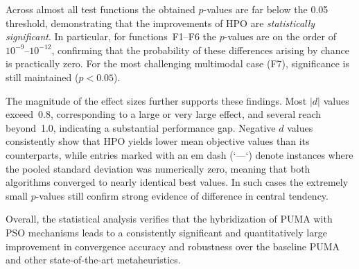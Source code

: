 \documentclass[a4paper,12pt]{article}
\begin{document}
Across almost all test functions the obtained $p$-values are far below the
0.05 threshold, demonstrating that the improvements of HPO are
\textit{statistically significant}.
In particular, for functions~F1–F6 the $p$-values are on the order of
$10^{-9}$–$10^{-12}$, confirming that the probability of these differences
arising by chance is practically zero.
For the most challenging multimodal case (F7), significance is still
maintained ($p<0.05$).

The magnitude of the effect sizes further supports these findings.
Most $|d|$ values exceed~0.8, corresponding to a large or very large effect,
and several reach beyond~1.0, indicating a substantial performance gap.
Negative $d$ values consistently show that HPO yields lower mean objective
values than its counterparts, while entries marked with an em dash
(`---`) denote instances where the pooled standard deviation was numerically
zero, meaning that both algorithms converged to nearly identical best values.
In such cases the extremely small $p$-values still confirm strong evidence
of difference in central tendency.

Overall, the statistical analysis verifies that the hybridization of
PUMA with PSO mechanisms leads to a consistently significant and
quantitatively large improvement in convergence accuracy and robustness
over the baseline PUMA and other state-of-the-art metaheuristics.
\end{document}
